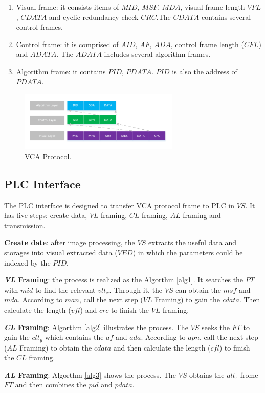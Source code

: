 \documentclass[journal,UTF8]{IEEEtran}
\begin{document}
 \begin{enumerate}
	\item Visual frame: it consists items of $MID$, $MSF$, $MDA$, visual frame length $VFL$, $CDATA$ and cyclic redundancy check $CRC$.The $CDATA$ contains several control frames.
	\item Control frame: it is comprised of $AID$, $AF$, $ADA$, control frame length ($CFL$) and $ADATA$.
	The $ADATA$ includes several algorithm frames. 
	\item Algorithm frame: it contains $PID$, $PDATA$. $PID$ is also the address of $PDATA$.
\end{enumerate}
\begin{figure}
	\centering
	\includegraphics[width=3in]{fig/Protocol.pdf}
	\caption{ VCA Protocol.}
	\label{fig:Protocol}
\end{figure}
\subsection{PLC Interface}
The PLC interface is designed to transfer VCA protocol frame to PLC in $VS$. It has five steps: create data, $VL$ framing, $CL$ framing, $AL$ framing and transmission.

\textbf{Create date}: after image processing, the $VS$ extracts the useful data and storages into visual extracted data ($VED$) in which the parameters could be indexed by the $PID$.

\textbf{\emph{VL} Framing}: the process is realized as the Algorthm \ref{alg1}. It searches the $PT$ with $mid$ to find the relevant $vlt_x$. Through it, the $VS$ can obtain the $msf$ and $mda$. According to $man$, call the next step ($VL$ Framing) to gain the $cdata$. Then calculate the length ($vfl$) and $crc$ to finish the $VL$ framing.

\textbf{\emph{CL} Framing}: Algorthm \ref{alg2} illustrates the process. The $VS$ seeks the $FT$ to gain the $clt_y$ which contains the $af$ and $ada$. According to $apn$, call the next step ($AL$ Framing) to obtain the $cdata$ and then calculate the length ($cfl$) to finish the $CL$ framing.  

\textbf{\emph{AL} Framing}: Algorthm \ref{alg3} shows the process. The $VS$ obtains the $alt_z$ frome $FT$ and then combines the $pid$ and $pdata$.
\end{document}
